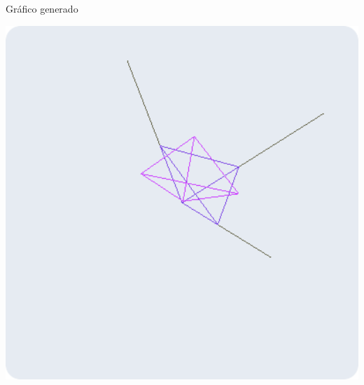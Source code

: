 \documentclass[a4paper]{article}
\begin{document}
\newpage
Gráfico generado 
\begin{center}
\includegraphics[width=16cm]{./src/2.png}
\end{center}
\end{document}
